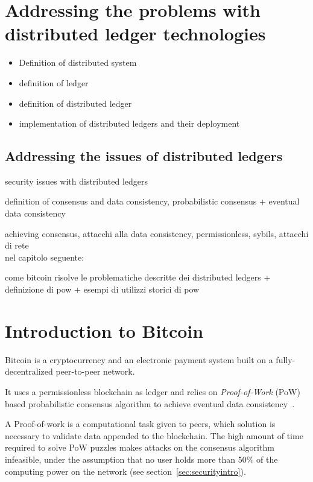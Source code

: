 \documentclass[12pt, letterpaper, twoside]{article}
\title{}
\author{}
\begin{document}
\maketitle

\section{Addressing the problems with distributed ledger technologies}\label{intro}
\begin{itemize}
	\item Definition of distributed system

	\item definition of ledger

	\item definition of distributed ledger

	\item implementation of distributed ledgers and their deployment
\end{itemize}

\subsection{Addressing the issues of distributed ledgers}\label{ledgerproblems}
security issues with distributed ledgers

definition of consensus and data consistency, probabilistic consensus + eventual data consistency

achieving consensus, attacchi alla data consistency, permissionless, sybils, attacchi di rete\\

nel capitolo seguente:

come bitcoin risolve le problematiche descritte dei distributed ledgers + definizione di pow + esempi di utilizzi storici di pow


\section{Introduction to Bitcoin}\label{sec:introbtc}
Bitcoin is a cryptocurrency and an electronic payment system built on a fully-decentralized peer-to-peer network.

It uses a permissionless blockchain as ledger and relies on \emph{Proof-of-Work} (PoW) based probabilistic consensus algorithm to achieve eventual data consistency~\cite{nakamoto}.

A Proof-of-work is a computational task given to peers, which solution is necessary to validate data appended to the blockchain. The high amount of time required to solve PoW puzzles makes attacks on the consensus algorithm infeasible, under the assumption that no user holds more than 50\% of the computing power on the network (see section~\ref{sec:securityintro}).
\end{document}
